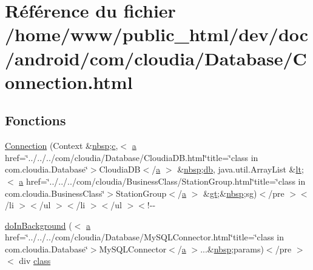 \hypertarget{_connection_8html}{\section{Référence du fichier /home/www/public\-\_\-html/dev/doc/android/com/cloudia/\-Database/\-Connection.html}
\label{_connection_8html}
}
\subsection*{Fonctions}
\begin{DoxyCompactItemize}
\item 
\hyperlink{_connection_8html_aaf53f3433a3a14fe982456bdae6d53c0}{Connection} (Context \&\hyperlink{_tools_8html_aef915316f784c9063d942974538301a6}{nbsp};\hyperlink{_connection_8html_ae0323a9039add2978bf5b49550572c7c}{c},$<$ \hyperlink{style_8css_a5e8981582017bb8b84c21f148345d1f7}{a} href=\char`\"{}../../../com/cloudia/Database/Cloudia\-D\-B.\-html\char`\"{}title=\char`\"{}class in com.\-cloudia.\-Database\char`\"{}$>$Cloudia\-D\-B$<$/\hyperlink{style_8css_a5e8981582017bb8b84c21f148345d1f7}{a} $>$ \&\hyperlink{_tools_8html_aef915316f784c9063d942974538301a6}{nbsp};\hyperlink{db_8js_ac6a1b1fd00c35062aea99d6f37a15054}{db}, java.\-util.\-Array\-List \&\hyperlink{overview-tree_8html_aac3322e12d911341c3d470b46b2d80f4}{lt};$<$ \hyperlink{style_8css_a5e8981582017bb8b84c21f148345d1f7}{a} href=\char`\"{}../../../com/cloudia/Business\-Class/Station\-Group.\-html\char`\"{}title=\char`\"{}class in com.\-cloudia.\-Business\-Class\char`\"{}$>$Station\-Group$<$/\hyperlink{style_8css_a5e8981582017bb8b84c21f148345d1f7}{a} $>$ \&\hyperlink{overview-tree_8html_a1bb4447113f0bd7bf49e2b3dee2e065d}{gt};\&\hyperlink{_tools_8html_aef915316f784c9063d942974538301a6}{nbsp};sg)$<$/pre $>$$<$/li $>$$<$/ul $>$$<$/li $>$$<$/ul $>$$<$!-\/-\/
\item 
\hyperlink{_connection_8html_a2a678b11c47137b3d70029c3907e5412}{do\-In\-Background} ($<$ \hyperlink{style_8css_a5e8981582017bb8b84c21f148345d1f7}{a} href=\char`\"{}../../../com/cloudia/Database/My\-S\-Q\-L\-Connector.\-html\char`\"{}title=\char`\"{}class in com.\-cloudia.\-Database\char`\"{}$>$My\-S\-Q\-L\-Connector$<$/\hyperlink{style_8css_a5e8981582017bb8b84c21f148345d1f7}{a} $>$...\&\hyperlink{_tools_8html_aef915316f784c9063d942974538301a6}{nbsp};params)$<$/pre $>$$<$ div \hyperlink{_tools_8html_acf06f836132665ba8114f5a414c2403f}{class}

\end{DoxyCompactItemize}
